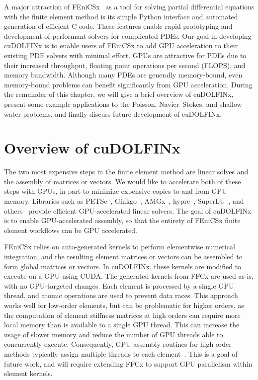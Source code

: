 A major attraction of FEniCSx~\citep{baratta2023dolfinx} as a tool for solving partial differential equations with the finite element method is its simple Python interface and automated generation of efficient C code. These features enable rapid prototyping and development of performant solvers for complicated PDEs. Our goal in developing cuDOLFINx \citep{cudolfinxzenodo} is to enable users of FEniCSx to add GPU acceleration to their existing PDE solvers with minimal effort.
GPUs are attractive for PDEs due to their increased throughput, floating point operations per second (FLOPS), and memory bandwidth. Although many PDEs are generally memory-bound, even memory-bound problems can benefit significantly from GPU acceleration. During the remainder of this chapter, we will give a brief overview of cuDOLFINx, present some example applications to the Poisson, Navier--Stokes, and shallow water problems, and finally discuss future development of cuDOLFINx.

\section*{Overview of cuDOLFINx}
The two most expensive steps in the finite element method are linear solves and the assembly of matrices or vectors. We would like to accelerate both of these steps with GPUs, in part to minimize expensive copies to and from GPU memory. Libraries such as PETSc~\citep{MILLS2021102831}, Ginkgo~\citep{ginkgo-toms-2022}, AMGx~\citep{naumov2015amgx}, hypre~\citep{li2020efficient,falgout2021porting}, SuperLU~\citep{li2023newly}, and others~\citep{lu2023tilesptrsv} provide efficient GPU-accelerated linear solvers. The goal of cuDOLFINx is to enable GPU-accelerated assembly, so that the entirety of FEniCSx finite element workflows can be GPU accelerated.

FEniCSx relies on auto-generated kernels to perform elementwise numerical integration, and the resulting element matrices or vectors can be assembled to form global matrices or vectors. In cuDOLFINx, these kernels are modified to execute on a GPU using CUDA. The generated kernels from FFCx are used as-is, with no GPU-targeted changes. Each element is processed by a single GPU thread, and atomic operations are used to prevent data races. This approach works well for low-order elements, but can be problematic for higher orders, as the computation of element stiffness matrices at high orders can require more local memory than is available to a single GPU thread. This can increase the usage of slower memory and reduce the number of GPU threads able to concurrently execute. Consequently, GPU assembly routines for high-order methods typically assign multiple threads to each element~\citep{MACIOL20101093,dziekonski2013generation,abdelfattah2021gpu, swirydowicz2019acceleration}. This is a goal of future work, and will require extending FFCx to support GPU parallelism within element kernels.

